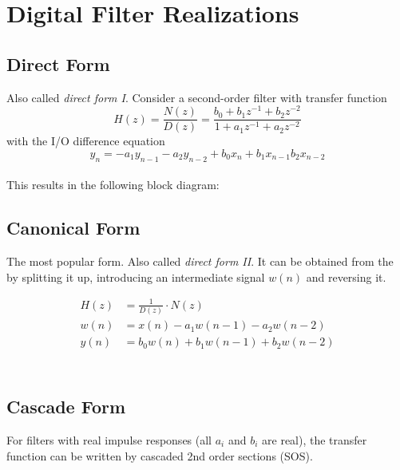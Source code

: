 \section{Digital Filter Realizations}

\subsection{Direct Form}
\label{sec:directform}
Also called \emph{direct form I}. Consider a second-order filter with
transfer function
\begin{equation*}
	H(z) = \frac{N(z)}{D(z)} 
		 = \frac{b_0 + b_1z^{-1} + b_2z^{-2}}{1 + a_1z^{-1} + a_2z^{-2}}
\end{equation*}
with the I/O difference equation
\begin{equation*}
	y_n = -a_1 y_{n-1} - a_2 y_{n-2} + b_0 x_n + b_1 x_{n-1} b_2 x_{n-2}
\end{equation*}\\

This results in the following block diagram: \\

\begin{center}
	
\end{center}

\subsection{Canonical Form}
\label{sec:canonicalform}
The most popular form. Also called \emph{direct form II}. It can be obtained from
the  by splitting it up, introducing an intermediate signal $w(n)$ and reversing it.

\begin{align*}
	H(z) &= \frac{1}{D(z)} \cdot N(z) \\
	w(n) &= x(n) - a_1 w(n-1) - a_2 w(n-2) \\
	y(n) &= b_0 w(n) + b_1 w(n-1) + b_2 w(n-2) \\
\end{align*}\\

\begin{center}
	
\end{center}

\subsection{Cascade Form}
\label{sec:cascadeform}
For filters with real impulse responses (all $a_i$ and $b_i$ are real), the
transfer function can be written by cascaded 2nd order sections (SOS).

